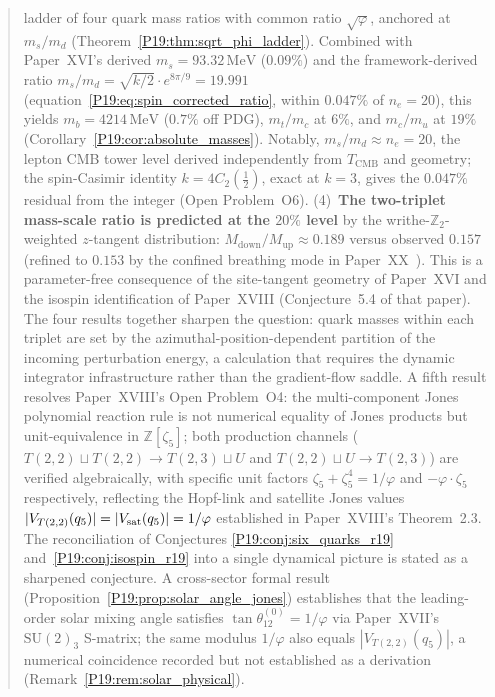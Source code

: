 \documentclass[11pt,a4paper]{article}
\theoremstyle{definition}\newtheorem{definition}[theorem]{Definition}
\theoremstyle{remark}
\newcommand{\vp}{\varphi}
\newcommand{\Ztwo}{\mathbb{Z}_2}
\newcommand{\Jones}{V}
\begin{document}
\begin{abstract}
ladder of four quark mass ratios with common ratio $\sqrt{\vp}$,
anchored at $m_s/m_d$
(Theorem~\ref{P19:thm:sqrt_phi_ladder}).  Combined with
Paper~XVI's derived $m_s=93.32\,\mathrm{MeV}$ ($0.09\%$) and the
framework-derived ratio $m_s/m_d=\sqrt{k/2}\cdot e^{8\pi/9}=19.991$
(equation~\eqref{P19:eq:spin_corrected_ratio}, within $0.047\%$ of
$n_e=20$), this yields
$m_b=4214\,\mathrm{MeV}$ ($0.7\%$ off PDG), $m_t/m_c$ at $6\%$,
and $m_c/m_u$ at $19\%$ (Corollary~\ref{P19:cor:absolute_masses}).
Notably, $m_s/m_d\approx n_e=20$, the lepton CMB tower level
derived independently from $T_{\mathrm{CMB}}$ and geometry;
the spin-Casimir identity $k=4C_2(\tfrac12)$, exact at $k=3$,
gives the $0.047\%$ residual from the integer (Open Problem~O6).
(4)~\textbf{The two-triplet mass-scale ratio is predicted at the
$20\%$ level} by the writhe-$\Ztwo$-weighted $z$-tangent
distribution: $M_{\mathrm{down}}/M_{\mathrm{up}}\approx0.189$ versus
observed $0.157$ (refined to $0.153$ by the confined breathing mode in
Paper~XX~\cite{Paper20}).  This is a parameter-free consequence of the
site-tangent geometry of Paper~XVI and the isospin identification
of Paper~XVIII (Conjecture~5.4 of that paper). %
The four results together sharpen the question: quark masses within
each triplet are set by the azimuthal-position-dependent
partition of the incoming perturbation energy, a calculation that
requires the dynamic integrator infrastructure rather than the
gradient-flow saddle.  A fifth result resolves Paper~XVIII's Open
Problem~O4: the multi-component Jones polynomial reaction rule is
not numerical equality of Jones products but unit-equivalence in
$\mathbb{Z}[\zeta_5]$; both production channels
($T(2,2)\sqcup T(2,2)\to T(2,3)\sqcup U$ and
$T(2,2)\sqcup U\to T(2,3)$) are verified algebraically, with
specific unit factors $\zeta_5+\zeta_5^4=1/\vp$ and
$-\vp\cdot\zeta_5$ respectively, reflecting the Hopf-link and
satellite Jones values $|\Jones_{T(2,2)}(q_5)|=|\Jones_{\rm sat}(q_5)|
=1/\vp$ established in Paper~XVIII's Theorem~2.3.
The reconciliation of Conjectures
\ref{P19:conj:six_quarks_r19} and~\ref{P19:conj:isospin_r19} into a single
dynamical picture is stated as a sharpened conjecture.
A cross-sector formal result (Proposition~\ref{P19:prop:solar_angle_jones})
establishes that the leading-order solar mixing angle satisfies
$\tan\theta_{12}^{(0)}=1/\vp$ via Paper~XVII's $\mathrm{SU}(2)_3$
S-matrix; the same modulus $1/\vp$ also equals
$|\Jones_{T(2,2)}(q_5)|$, a numerical coincidence recorded but not
established as a derivation (Remark~\ref{P19:rem:solar_physical}).
\end{abstract}
\end{document}
